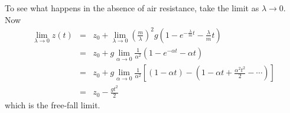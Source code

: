 \begin{example}
To see what happens in the absence of air resistance, take the limit as
$\lambda\to 0$.  Now 
\begin{eqnarray*}
\lim_{\lambda\to 0} z(t)
&=&z_0+\lim_{\lambda\to 0}\left(\frac{m}{\lambda}\right)^2g\left(
1-e^{-\frac{\lambda}{m}t}-\frac{\lambda}{m}t\right) \\
&=&z_0+g\lim_{\alpha\to 0}\frac{1}{\alpha^2}
	\left(1-e^{-\alpha t}-\alpha t\right) \\
&=&z_0+g\lim_{\alpha\to 0}\frac{1}{\alpha^2}
	\left[(1-\alpha t)-\left(1-\alpha t +\frac{\alpha^2t^2}{2}-\cdots
\right)\right] \\
&=&z_0-\frac{gt^2}{2}
\end{eqnarray*}
which is the free-fall limit.
\end{example}

